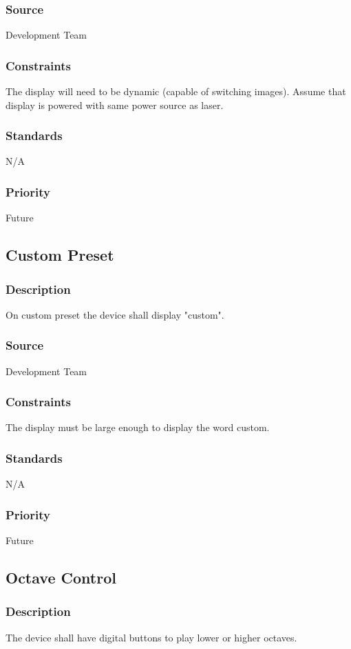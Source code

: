 \subsubsection{Source}
Development Team
\subsubsection{Constraints}
The display will need to be dynamic (capable of switching images). Assume that display is powered with same power source as laser.
\subsubsection{Standards}
N/A
\subsubsection{Priority}
Future

\subsection{Custom Preset}
\subsubsection{Description}
On custom preset the device shall display "custom".
\subsubsection{Source}
Development Team
\subsubsection{Constraints}
The display must be large enough to display the word custom.
\subsubsection{Standards}
N/A
\subsubsection{Priority}
Future

\subsection{Octave Control}
\subsubsection{Description}
The device shall have digital buttons to play lower or higher octaves.

